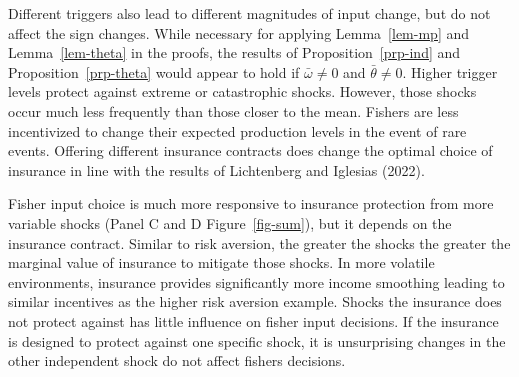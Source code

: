 \documentclass[
  letterpaper,
  DIV=11,
  numbers=noendperiod]{scrartcl}
\theoremstyle{plain}
\theoremstyle{plain}
\theoremstyle{remark}
\begin{document}
Different triggers also lead to different magnitudes of input change,
but do not affect the sign changes. While necessary for applying
Lemma~\ref{lem-mp} and Lemma~\ref{lem-theta} in the proofs, the results
of Proposition~\ref{prp-ind} and Proposition~\ref{prp-theta} would
appear to hold if \(\bar\omega\ne0\) and \(\bar\theta\ne0\). Higher
trigger levels protect against extreme or catastrophic shocks. However,
those shocks occur much less frequently than those closer to the mean.
Fishers are less incentivized to change their expected production levels
in the event of rare events. Offering different insurance contracts does
change the optimal choice of insurance in line with the results of
Lichtenberg and Iglesias (2022).

Fisher input choice is much more responsive to insurance protection from
more variable shocks (Panel C and D Figure~\ref{fig-sum}), but it
depends on the insurance contract. Similar to risk aversion, the greater
the shocks the greater the marginal value of insurance to mitigate those
shocks. In more volatile environments, insurance provides significantly
more income smoothing leading to similar incentives as the higher risk
aversion example. Shocks the insurance does not protect against has
little influence on fisher input decisions. If the insurance is designed
to protect against one specific shock, it is unsurprising changes in the
other independent shock do not affect fishers decisions.
\end{document}
